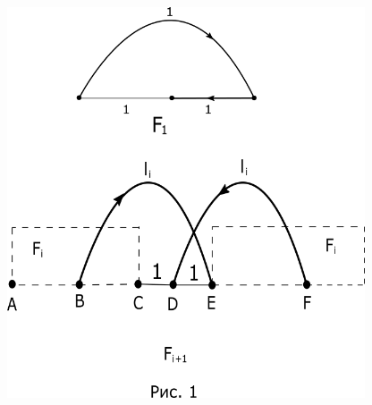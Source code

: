 \documentclass[a4paper, 14pt]{extarticle}
\begin{document}
\begin{center}
\includegraphics[width=300pt]{ris1.png}
\end{center}
\end{document}
